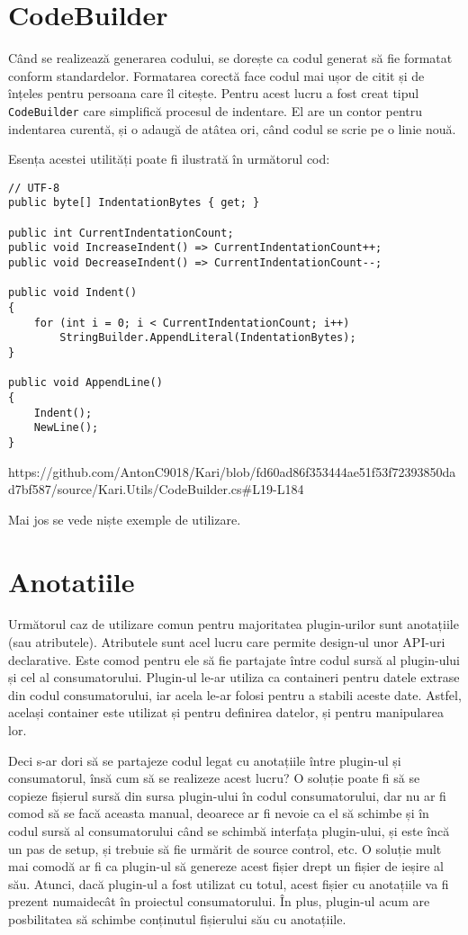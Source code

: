 \documentclass[a4paper,12pt]{report}
\begin{document}
\section{CodeBuilder}

Când se realizează generarea codului, se dorește ca codul generat să fie formatat conform standardelor.
Formatarea corectă face codul mai ușor de citit și de înțeles pentru persoana care îl citește.
Pentru acest lucru a fost creat tipul \texttt{CodeBuilder} care simplifică procesul de indentare.
El are un contor pentru indentarea curentă, și o adaugă de atâtea ori, când codul se scrie pe o linie nouă.

Esența acestei utilități poate fi ilustrată în următorul cod:

\begin{verbatim}
// UTF-8
public byte[] IndentationBytes { get; }

public int CurrentIndentationCount;
public void IncreaseIndent() => CurrentIndentationCount++;
public void DecreaseIndent() => CurrentIndentationCount--;

public void Indent()
{
    for (int i = 0; i < CurrentIndentationCount; i++)
        StringBuilder.AppendLiteral(IndentationBytes);
}

public void AppendLine() 
{ 
    Indent();
    NewLine();
}
\end{verbatim}

https://github.com/AntonC9018/Kari/blob/fd60ad86f353444ae51f53f72393850dad7bf587/source/Kari.Utils/CodeBuilder.cs#L19-L184

Mai jos se vede niște exemple de utilizare.

\section{Anotatiile}

Următorul caz de utilizare comun pentru majoritatea plugin-urilor sunt anotațiile (sau atributele).
Atributele sunt acel lucru care permite design-ul unor API-uri declarative.
Este comod pentru ele să fie partajate între codul sursă al plugin-ului și cel al consumatorului.
Plugin-ul le-ar utiliza ca containeri pentru datele extrase din codul consumatorului, iar acela le-ar folosi pentru a stabili aceste date.
Astfel, același container este utilizat și pentru definirea datelor, și pentru manipularea lor.

Deci s-ar dori să se partajeze codul legat cu anotațiile între plugin-ul și consumatorul, însă cum să se realizeze acest lucru?
O soluție poate fi să se copieze fișierul sursă din sursa plugin-ului în codul consumatorului, dar nu ar fi comod să se facă aceasta manual, deoarece ar fi nevoie ca el să schimbe și în codul sursă al consumatorului când se schimbă interfața plugin-ului, și este încă un pas de setup, și trebuie să fie urmărit de source control, etc.
O soluție mult mai comodă ar fi ca plugin-ul să genereze acest fișier drept un fișier de ieșire al său.
Atunci, dacă plugin-ul a fost utilizat cu totul, acest fișier cu anotațiile va fi prezent numaidecât în proiectul consumatorului.
În plus, plugin-ul acum are posbilitatea să schimbe conținutul fișierului său cu anotațiile.
\end{document}

